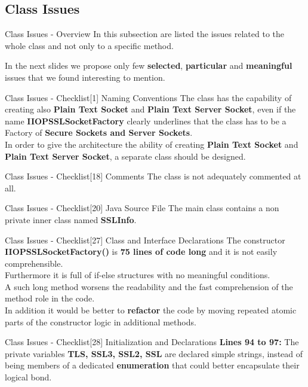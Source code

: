 \documentclass{../common/latex_classes/pdf_presentation}
\newcommand{\renderPartialCode}[2]{}
\begin{document}
	\subsection{Class Issues}
	
	\begin{frame}{Class Issues - Overview}
		In this subsection are listed the issues related to the whole class and not only to a specific method. \par
		In the next slides we propose only few \textbf{selected}, \textbf{particular} and \textbf{meaningful} issues that we found interesting to mention.
	\end{frame}
	\begin{frame}{Class Issues - Checklist[1] Naming Conventions}
		The class has the capability of creating also \textbf{Plain Text Socket} and \textbf{Plain Text Server Socket}, even if the name \textbf{IIOPSSLSocketFactory} clearly underlines that the class has to be a Factory of \textbf{Secure Sockets and Server Sockets}. \\
		In order to give the architecture the ability of creating \textbf{Plain Text Socket} and \textbf{Plain Text Server Socket}, a separate class should be designed.
	\end{frame}
	\begin{frame}{Class Issues - Checklist[18] Comments}
		The class is not adequately commented at all.
	\end{frame}
	\begin{frame}{Class Issues - Checklist[20] Java Source File}
		The main class contains a non private inner class named \textbf{SSLInfo}.
	\end{frame}
	\begin{frame}{Class Issues - Checklist[27] Class and Interface Declarations}
		The constructor \textbf{IIOPSSLSocketFactory()} is \textbf{75 lines of code long} and it is not easily comprehensible.\\
		Furthermore it is full of if-else structures with no meaningful conditions.\\
		A such long method worsens the readability and the fast comprehension of the method role in the code.\\
		In addition it would be better to \textbf{refactor} the code by moving repeated atomic parts of the constructor logic in additional methods.
	\end{frame}
	\begin{frame}{Class Issues - Checklist[28] Initialization and Declarations}
		\textbf{Lines 94 to 97:} The private variables \textbf{TLS, SSL3, SSL2, SSL} are declared simple strings, instead of being members of a dedicated \textbf{enumeration} that could better encapsulate their logical bond.
	\end{frame}
\end{document}
